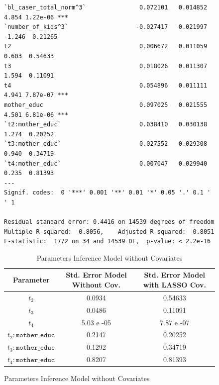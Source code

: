 \documentclass{article}
\begin{document}
\begin{figure}[H]
\begin{lstlisting}[style=RstyleComment, caption=CATE with Controls selected by LASSO]
`bl_caser_total_norm^3`               0.072101   0.014852   4.854 1.22e-06 ***
`number_of_kids^3`                   -0.027417   0.021997  -1.246  0.21265    
t2                                    0.006672   0.011059   0.603  0.54633    
t3                                    0.018026   0.011307   1.594  0.11091    
t4                                    0.054896   0.011111   4.941 7.87e-07 ***
mother_educ                           0.097025   0.021555   4.501 6.81e-06 ***
`t2:mother_educ`                      0.038410   0.030138   1.274  0.20252    
`t3:mother_educ`                      0.027552   0.029308   0.940  0.34719    
`t4:mother_educ`                      0.007047   0.029940   0.235  0.81393    
---
Signif. codes:  0 '***' 0.001 '**' 0.01 '*' 0.05 '.' 0.1 ' ' 1

Residual standard error: 0.4416 on 14539 degrees of freedom
Multiple R-squared:  0.8056,	Adjusted R-squared:  0.8051 
F-statistic:  1772 on 34 and 14539 DF,  p-value: < 2.2e-16
\end{lstlisting}
\end{figure}

\begin{figure}[H]
  \begin{table}[H]
  \centering
  \begin{tabular}{|c|cc|}
    \hline
    Parameter & Std. Error Model Without Cov. & Std. Error Model with LASSO Cov. \\
    \hline
    $t_2$                       & 0.0934       & 0.54633    \\
    $t_3$                       & 0.0486       & 0.11091    \\
    $t_4$                       & 5.03 e -05   & 7.87 e -07 \\
    $t_2 : \texttt{mother\_educ}$ & 0.2147      & 0.20252    \\
    $t_3 : \texttt{mother\_educ}$ & 0.1292      & 0.34719    \\
    $t_4 : \texttt{mother\_educ}$ & 0.8207      & 0.81393    \\
    \hline
  \end{tabular}
  \caption{Parameters Inference Model without Covariates}
\end{table}
\end{figure}
\end{document}
